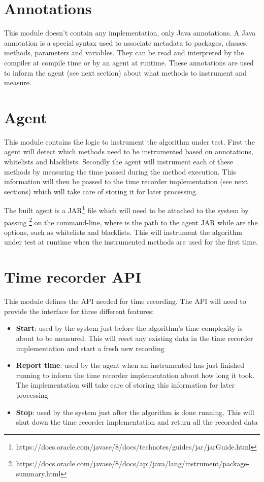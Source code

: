 \section{Annotations}
\label{sec:design:annotations}
This module doesn't contain any implementation, only Java annotations. A Java annotation is a special syntax used to associate metadata to packages, classes, methods, parameters and variables. They can be read and interpreted by the compiler at compile time or by an agent at runtime. These annotations are used to inform the agent (see next section) about what methods to instrument and measure.


\section{Agent}
\label{sec:design:agent}
This module contains the logic to instrument the algorithm under test. First the agent will detect which methods need to be instrumented based on annotations, whitelists and blacklists. Secondly the agent will instrument each of these methods by measuring the time passed during the method execution. This information will then be passed to the time recorder implementation (see next sections) which will take care of storing it for later processing.

\noindent The built agent is a JAR\footnote{https://docs.oracle.com/javase/8/docs/technotes/guides/jar/jarGuide.html} file which will need to be attached to the system by passing \footnote{https://docs.oracle.com/javase/8/docs/api/java/lang/instrument/package-summary.html} on the command-line, where  is the path to the agent JAR while  are the options, such as whitelists and blacklists. This will instrument the algorithm under test at runtime when the instrumented methods are used for the first time.


\section{Time recorder API}
This module defines the API needed for time recording. The API will need to provide the interface for three different features:
\begin{itemize}
  \item \textbf{Start}: used by the system just before the algorithm's time complexity is about to be measured. This will reset any existing data in the time recorder implementation and start a fresh new recording
  \item \textbf{Report time}: used by the agent when an instrumented has just finished running to inform the time recorder implementation about how long it took. The implementation will take care of storing this information for later processing
  \item \textbf{Stop}: used by the system just after the algorithm is done running. This will shut down the time recorder implementation and return all the recorded data
\end{itemize}

